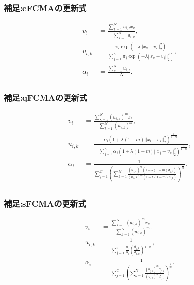 \documentclass[13pt,dvipdfmx]{beamer}
\begin{document}
\begin{frame}\frametitle{補足:eFCMAの更新式}
   \begin{eqnarray*}
   &v_{i}& =\frac{\sum_{k=1}^Nu_{i,k}x_{k}}{\quad\sum_{k=1}^Nu_{i,k}},\\
   &u_{i,k}&=\frac{\pi_{i}\exp(-\lambda||x_k-v_i||_2^2)}{\sum_{j=1}^C\pi_{j}\exp(-\lambda||x_k-v_j||_2^2)},\\
   &\alpha_{i}&=\frac{\sum_{k=1}^Nu_{i,k}}{\quad N}.\\
   \end{eqnarray*}
\end{frame}

\begin{frame}\frametitle{補足:qFCMAの更新式}
  \begin{eqnarray*}
    &v_{i}&=\frac{\sum_{k=1}^N(u_{i,k})^mx_{k}}{\quad\sum_{k=1}^N(u_{i,k})^{m}},\quad\\
    &u_{i,k}&=\frac{\alpha_{i}(1+\lambda(1-m)||x_i-v_k||_2^2)^\frac{1}{1-m}}{\quad\sum_{j=1}^C\alpha_{j}(1+\lambda(1-m)||x_j-v_k||_2^2)^\frac{1}{1-m}},\\
    & \alpha_{i}&=\frac{1}{\sum_{j=1}^C\left(\sum_{k=1}^N\frac{(u_{j,k})^m(1-\lambda(1-m)d_{j,k})}{(u_i,k)^m(1-\lambda(1-m)d_{i,k})}\right)^{\frac{1}{m}}}.\\
      \end{eqnarray*}
\end{frame}

\begin{frame}\frametitle{補足:sFCMAの更新式}
  \begin{eqnarray*}
  &v_{i}&=\frac{\sum_{k=1}^N(u_{i,k})^mx_{k}}{\quad\sum_{k=1}^N(u_{i,k})^{m}},\\
  &u_{i,k}&=\frac{1}{\sum_{j=1}^c\frac{\alpha_{j}}{\alpha_{i}}\left(\frac{d_{j,k}}{d_{i,k}}\right)^\frac{1}{1-m}},\\
  &\alpha_{i}&=\frac{1}{\sum_{j=1}^C\left(\sum_{k=1}^N\frac{(u_{j,k})^md_{j,k}}{(u_{i,k})^md_{i,k}}\right)^{\frac{1}{m}}}.\\
  \end{eqnarray*}
\end{frame}
\end{document}
